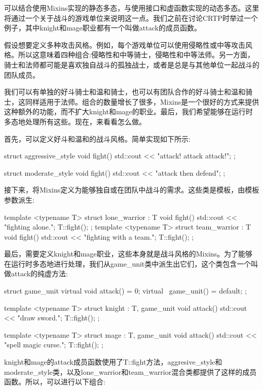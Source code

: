 可以结合使用Mixins实现的静态多态，与使用接口和虚函数实现的动态多态。这里将通过一个关于战斗的游戏单位来说明这一点。我们之前在讨论CRTP时举过一个例子，其中knight和mage职业都有一个叫做attack的成员函数。

假设想要定义多种攻击风格。例如，每个游戏单位可以使用侵略性或中等攻击风格。所以这意味着四种组合:侵略性和中等骑士，侵略性和中等法师。另一方面，骑士和法师都可能是喜欢独自战斗的孤独战士，或者是总是与其他单位一起战斗的团队成员。

我们可以有单独的好斗骑士和温和骑士，也可以有团队合作的好斗骑士和温和骑士，这同样适用于法师。组合的数量增长了很多，Mixins是一个很好的方式来提供这种额外的功能，而不扩大knight和mage的职业。最后，我们希望能够在运行时多态地处理所有这些。现在，来看看怎么做。

首先，可以定义好斗和温和的战斗风格。简单实现如下所示:

\begin{cpp}
struct aggressive_style
{
	void fight()
	{
		std::cout << "attack! attack attack!\n";
	}
};

struct moderate_style
{
	void fight()
	{
		std::cout << "attack then defend\n";
	}
};
\end{cpp}

接下来，将Mixins定义为能够独自或在团队中战斗的需求。这些类是模板，由模板参数派生:

\begin{cpp}
template <typename T>
struct lone_warrior : T
{
	void fight()
	{
		std::cout << "fighting alone.";
		T::fight();
	}
};
template <typename T>
struct team_warrior : T
{
	void fight()
	{
		std::cout << "fighting with a team.";
		T::fight();
	}
};
\end{cpp}

最后，需要定义knight和mage职业，这些本身就是战斗风格的Mixins。为了能够在运行时多态地进行处理，我们从game\_unit类中派生出它们，这个类包含一个叫做attack的纯虚方法:

\begin{cpp}
struct game_unit
{
	virtual void attack() = 0;
	virtual ~game_unit() = default;
};

template <typename T>
struct knight : T, game_unit
{
	void attack()
	{
		std::cout << "draw sword.";
		T::fight();
	}
};

template <typename T>
struct mage : T, game_unit
{
	void attack()
	{
		std::cout << "spell magic curse.";
		T::fight();
	}
};
\end{cpp}

knight和mage的attack成员函数使用了T::fight方法，aggresive\_style和moderate\_style类，以及lone\_warrior和team\_warrior混合类都提供了这样的成员函数。所以，可以进行以下组合:

